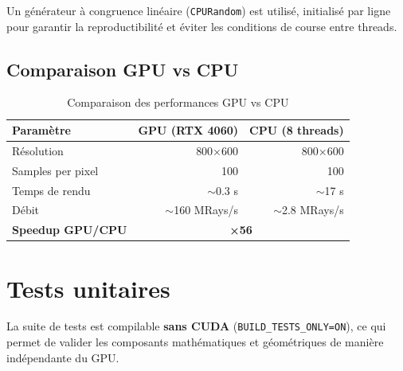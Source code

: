 \documentclass[12pt,a4paper]{article}
\begin{document}
Un générateur à congruence linéaire (\texttt{CPURandom}) est utilisé,
initialisé par ligne pour garantir la reproductibilité et éviter les
conditions de course entre threads.

\subsection{Comparaison GPU vs CPU}

\begin{table}[H]
\centering
\begin{tabular}{lrr}
\toprule
\textbf{Paramètre} & \textbf{GPU (RTX 4060)} & \textbf{CPU (8 threads)} \\
\midrule
Résolution          & 800×600     & 800×600 \\
Samples per pixel   & 100         & 100 \\
Temps de rendu      & $\sim$0.3 s & $\sim$17 s \\
Débit               & $\sim$160 MRays/s & $\sim$2.8 MRays/s \\
\textbf{Speedup GPU/CPU} & \multicolumn{2}{c}{\textbf{×56}} \\
\bottomrule
\end{tabular}
\caption{Comparaison des performances GPU vs CPU}
\end{table}

\section{Tests unitaires}

La suite de tests est compilable \textbf{sans CUDA} (\texttt{BUILD\_TESTS\_ONLY=ON}),
ce qui permet de valider les composants mathématiques et géométriques de manière
indépendante du GPU.
\end{document}
